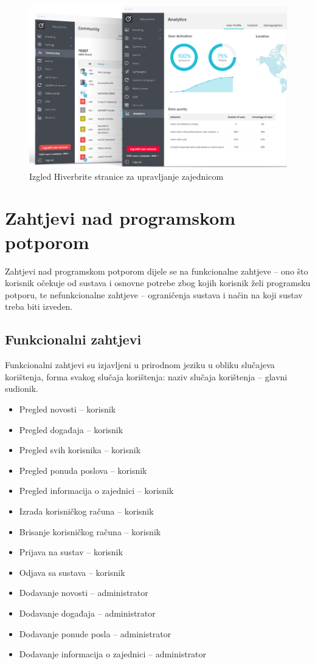\documentclass[times, utf8, zavrsni]{fer}
\begin{document}
\begin{figure}[!htb]
	\centering
	\includegraphics[width=13cm]{slike/hiverbrite-upravljanje.png}
	\caption{Izgled Hiverbrite stranice za upravljanje zajednicom}
	\label{fig:hiverbrite-menagements}
\end{figure}

\chapter{Zahtjevi nad programskom potporom}
Zahtjevi nad programskom potporom dijele se na funkcionalne zahtjeve – ono što korisnik očekuje od sustava i osnovne potrebe zbog kojih korisnik želi programsku potporu, te nefunkcionalne zahtjeve – ograničenja sustava i način na koji sustav treba biti izveden.

\section{Funkcionalni zahtjevi}
Funkcionalni zahtjevi su izjavljeni u prirodnom jeziku u obliku slučajeva korištenja, forma svakog slučaja korištenja: naziv slučaja korištenja – glavni sudionik.

 
\begin{itemize}
	\item Pregled novosti – korisnik
	\item Pregled događaja – korisnik
	\item Pregled svih korisnika – korisnik
	\item Pregled ponuda poslova – korisnik
	\item Pregled informacija o zajednici – korisnik
	\item Izrada korisničkog računa – korisnik
	\item Brisanje korisničkog računa – korisnik 
	\item Prijava na sustav – korisnik 
	\item Odjava sa sustava – korisnik
	\item Dodavanje novosti – administrator
	\item Dodavanje događaja – administrator 
	\item Dodavanje ponude posla – administrator
	\item Dodavanje informacija o zajednici – administrator 
\end{itemize}
\end{document}
